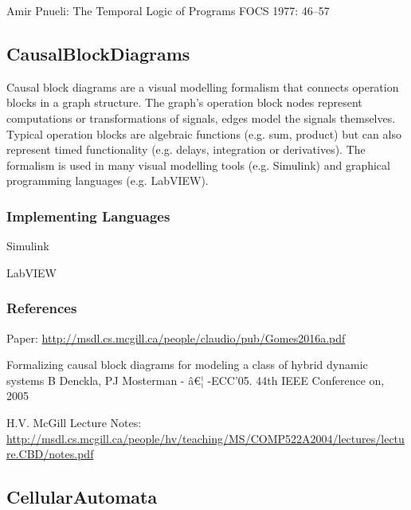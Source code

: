 Amir Pnueli: The Temporal Logic of Programs FOCS 1977: 46--57






\subsection{CausalBlockDiagrams}
\label{subsecF:CausalBlockDiagrams}


Causal block diagrams are a visual modelling formalism that connects operation blocks in a graph structure.
The graph's operation block nodes represent computations or transformations of signals, edges model the signals themselves.
Typical operation blocks are algebraic functions (e.g. sum, product) but can also represent timed functionality (e.g. delays, integration or derivatives).
The formalism is used in many visual modelling tools (e.g. Simulink) and graphical programming languages (e.g. LabVIEW).



\subsubsection{Implementing Languages}

Simulink

LabVIEW

\subsubsection{References}
Paper: \url{http://msdl.cs.mcgill.ca/people/claudio/pub/Gomes2016a.pdf}

Formalizing causal block diagrams for modeling a class of hybrid dynamic systems
B Denckla, PJ Mosterman - â€¦ -ECC'05. 44th IEEE Conference on, 2005

H.V. McGill Lecture Notes: \url{http://msdl.cs.mcgill.ca/people/hv/teaching/MS/COMP522A2004/lectures/lecture.CBD/notes.pdf}



\subsection{CellularAutomata}
\label{subsecF:CellularAutomata}

